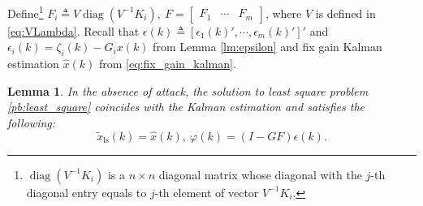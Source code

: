 \documentclass[12pt]{article}  %
\newcommand{\ls}{\text{ls}}
\DeclareMathOperator{\diag}{{diag}}
\newtheorem{lemma}{\textbf{Lemma}}
\begin{document}
Define\footnote{$\diag(V^{-1}K_i)$ is a $n\times n$ diagonal matrix whose diagonal with the $j$-th diagonal entry equals to $j$-th element of vector $V^{-1}K_i$.} 
$F_i\triangleq V\diag(V^{-1}K_i),\ F=\begin{bmatrix} F_1&\cdots & F_m \end{bmatrix}$,
where $V$ is defined in \eqref{eq:VLambda}.
Recall that $\epsilon(k)\triangleq\left[\epsilon_1(k){'},\cdots,\epsilon_m(k){'}\right]{'}$ and $\epsilon_i(k)=\zeta_i(k)-G_ix(k)$ from Lemma \ref{lm:epsilon} and fix gain Kalman estimation $\hat{x}(k)$ from \eqref{eq:fix_gain_kalman}.
\begin{lemma}\label{lm:least_square}
	In the absence of attack,  the solution to least square problem \eqref{pb:least_square} coincides with the Kalman estimation and satisfies the following:
	\begin{equation*}
	\tilde{x}_\ls(k)=\hat{x}(k),\ \varphi(k)=(I-GF)\epsilon(k).
	\end{equation*}
\end{lemma}
\end{document}
